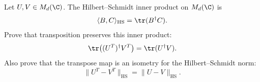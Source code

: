 Let $U,V\in M_d(\C)$.  The Hilbert--Schmidt inner product on $M_d(\C)$ is
$$
    \langle B,C\rangle_{\mathrm{HS}}
    =
    \tr(B^\dagger C).
$$
Prove that transposition preserves this inner product:
$$
    \tr\!\left((U^T)^\dagger V^T\right)
    =
    \tr(U^\dagger V).
$$
Also prove that the transpose map is an isometry for the Hilbert--Schmidt norm:
$$
    \lVert U^T-V^T\rVert_{\mathrm{HS}}
    =
    \lVert U-V\rVert_{\mathrm{HS}}.
$$

